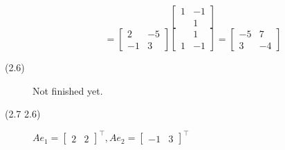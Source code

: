 \begin{description}
$$\begin{bmatrix}
1 & -1 \\
& 1
\end{bmatrix}$$
$$= \begin{bmatrix}
2 & -5 \\
-1 & 3
\end{bmatrix}\begin{bmatrix}
& 1 \\
1 & -1
\end{bmatrix} = \begin{bmatrix}
-5 & 7 \\
3 & -4
\end{bmatrix}$$
\item[(2.6)]
Not finished yet.

\item[(2.7 {\color{cBlue}2.6})]
$Ae_1 = \begin{bmatrix}
2 & 2
\end{bmatrix}^\top, Ae_2 = \begin{bmatrix}
-1 & 3
\end{bmatrix}^\top$


\end{description}
